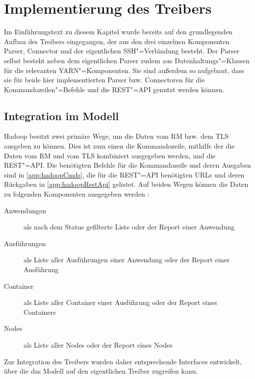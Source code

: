 \section{Implementierung des Treibers}
\label{sec:sshDriver}

Im Einführungstext zu diesem Kapitel wurde bereits auf den grundlegenden Aufbau des Treibers eingegangen, der aus den drei einzelnen Komponenten Parser, Connector und der eigentlichen SSH"=Verbindung besteht.
Der Parser selbst besteht neben dem eigentlichen Parser zudem aus Datenhaltungs"=Klassen für die relevanten YARN"=Komponenten.
Sie sind außerdem so aufgebaut, dass sie für beide hier implementierten Parser bzw. Connectoren für die Kommandozeilen"=Befehle und die REST"=API genutzt werden können.

\subsection{Integration im Modell}
\label{subsec:modelIntegration}

Hadoop besitzt zwei primäre Wege, um die Daten vom \ac{RM} bzw. dem \ac{TLS} ausgeben zu können.
Dies ist zum einen die Kommandozeile, mithilfe der die Daten vom \ac{RM} und vom \ac{TLS} kombiniert ausgegeben werden, und die REST"=API.
Die benötigten Befehle für die Kommandozeile und deren Ausgaben sind in \autoref{app:hadoopCmds}, die für die REST"=API benötigten URLs und deren Rückgaben in \autoref{app:hadoopRestApi} gelistet.
Auf beiden Wegen können \uA die Daten zu folgenden Komponenten ausgegeben werden \cite{HadoopYarnTlServer271,HadoopYarnCmds271,HadoopRmApi271,HadoopNmApi271}:

\begin{description}
    \item[Anwendungen] als nach dem Status gefilterte Liste oder der Report einer Anwendung
    \item[Ausführungen] als Liste aller Ausführungen einer Anwendung oder der Report einer Ausführung
    \item[Container] als Liste aller Container einer Ausführung oder der Report eines Containers
    \item[Nodes] als Liste aller Nodes oder der Report eines Nodes
\end{description}

Zur Integration des Treibers wurden daher entsprechende Interfaces entwickelt, über die das Modell auf den eigentlichen Treiber zugreifen kann.

